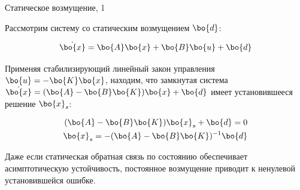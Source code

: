 \documentclass{beamer}
\begin{document}
%		
%		
%		


\begin{frame}{Статическое возмущение, 1}
	\begin{flushleft}
		
		Рассмотрим систему со статическим возмущением $\bo{d}$:
		
		\begin{equation}
			\dot {\bo{x}} = \bo{A} \bo{x} + \bo{B} \bo{u} + \bo{d}
		\end{equation}
		
		Применяя стабилизирующий линейный закон управления $\bo{u} = -\bo{K}\bo{x}$, находим, что замкнутая система $\dot {\bo{x}} =( \bo{A} -  \bo{B}  \bo{K}  )\bo{x} + \bo{d}$ имеет установившееся решение $\bo{x}_s$:
		
		\begin{align}
			( \bo{A} -  \bo{B}  \bo{K}  )\bo{x}_s + \bo{d} = 0
			\\
			\bo{x}_s = -( \bo{A} -  \bo{B}  \bo{K}  )^{-1} \bo{d}
		\end{align}
		
		Даже если статическая обратная связь по состоянию обеспечивает асимптотическую устойчивость, постоянное возмущение приводит к ненулевой установившейся ошибке.
		
	\end{flushleft}
\end{frame}
\end{document}
